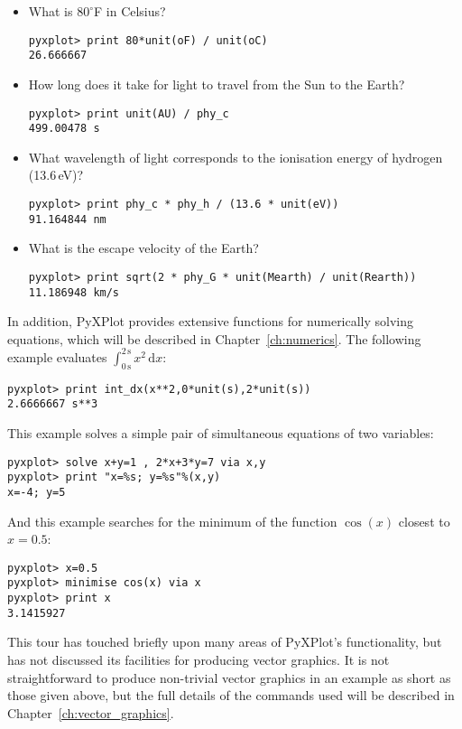 \begin{itemize}
\item What is $80^\circ$F in Celsius?
\begin{verbatim}
pyxplot> print 80*unit(oF) / unit(oC)
26.666667
\end{verbatim}

\item How long does it take for light to travel from the Sun to the Earth?
\begin{verbatim}
pyxplot> print unit(AU) / phy_c
499.00478 s
\end{verbatim}

\item What wavelength of light corresponds to the ionisation energy of hydrogen (13.6\,eV)?
\begin{verbatim}
pyxplot> print phy_c * phy_h / (13.6 * unit(eV))
91.164844 nm
\end{verbatim}

\item What is the escape velocity of the Earth?
\begin{verbatim}
pyxplot> print sqrt(2 * phy_G * unit(Mearth) / unit(Rearth))
11.186948 km/s
\end{verbatim}
\end{itemize}

In addition, PyXPlot provides extensive functions for numerically solving
equations, which will be described in Chapter~\ref{ch:numerics}. The following
example evaluates $\int_{0\,\mathrm{s}}^{2\,\mathrm{s}} x^2\,\mathrm{d}x$:

\begin{verbatim}
pyxplot> print int_dx(x**2,0*unit(s),2*unit(s))
2.6666667 s**3
\end{verbatim}

This example solves a simple pair of simultaneous equations of two variables:

\begin{verbatim}
pyxplot> solve x+y=1 , 2*x+3*y=7 via x,y
pyxplot> print "x=%s; y=%s"%(x,y)
x=-4; y=5
\end{verbatim}

And this example searches for the minimum of the function $\cos(x)$ closest to $x=0.5$:

\begin{verbatim}
pyxplot> x=0.5
pyxplot> minimise cos(x) via x
pyxplot> print x
3.1415927
\end{verbatim}

This tour has touched briefly upon many areas of PyXPlot's functionality, but
has not discussed its facilities for producing vector graphics. It is not
straightforward to produce non-trivial vector graphics in an example as short
as those given above, but the full details of the commands used will be
described in Chapter~\ref{ch:vector_graphics}.

